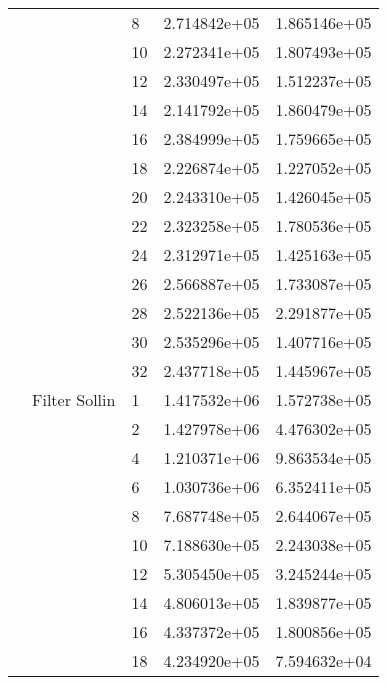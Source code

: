 \begin{tabular}{lllrr}
                      &            & 8  &  2.714842e+05 &  1.865146e+05 \\
                      &            & 10 &  2.272341e+05 &  1.807493e+05 \\
                      &            & 12 &  2.330497e+05 &  1.512237e+05 \\
                      &            & 14 &  2.141792e+05 &  1.860479e+05 \\
                      &            & 16 &  2.384999e+05 &  1.759665e+05 \\
                      &            & 18 &  2.226874e+05 &  1.227052e+05 \\
                      &            & 20 &  2.243310e+05 &  1.426045e+05 \\
                      &            & 22 &  2.323258e+05 &  1.780536e+05 \\
                      &            & 24 &  2.312971e+05 &  1.425163e+05 \\
                      &            & 26 &  2.566887e+05 &  1.733087e+05 \\
                      &            & 28 &  2.522136e+05 &  2.291877e+05 \\
                      &            & 30 &  2.535296e+05 &  1.407716e+05 \\
                      &            & 32 &  2.437718e+05 &  1.445967e+05 \\
                      & Filter Sollin & 1  &  1.417532e+06 &  1.572738e+05 \\
                      &            & 2  &  1.427978e+06 &  4.476302e+05 \\
                      &            & 4  &  1.210371e+06 &  9.863534e+05 \\
                      &            & 6  &  1.030736e+06 &  6.352411e+05 \\
                      &            & 8  &  7.687748e+05 &  2.644067e+05 \\
                      &            & 10 &  7.188630e+05 &  2.243038e+05 \\
                      &            & 12 &  5.305450e+05 &  3.245244e+05 \\
                      &            & 14 &  4.806013e+05 &  1.839877e+05 \\
                      &            & 16 &  4.337372e+05 &  1.800856e+05 \\
                      &            & 18 &  4.234920e+05 &  7.594632e+04 \\

\end{tabular}
